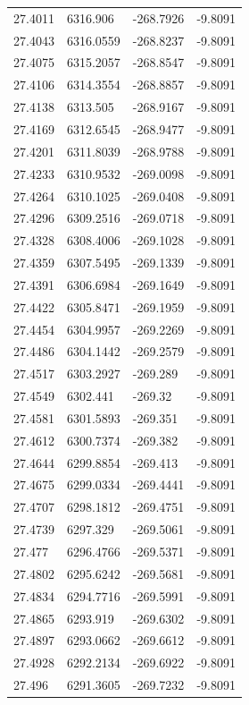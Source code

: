 \begin{table}[H]
\begin{tabular}{llll}
27.4011 & 6316.906 & -268.7926 & -9.8091 \\
27.4043 & 6316.0559 & -268.8237 & -9.8091 \\
27.4075 & 6315.2057 & -268.8547 & -9.8091 \\
27.4106 & 6314.3554 & -268.8857 & -9.8091 \\
27.4138 & 6313.505 & -268.9167 & -9.8091 \\
27.4169 & 6312.6545 & -268.9477 & -9.8091 \\
27.4201 & 6311.8039 & -268.9788 & -9.8091 \\
27.4233 & 6310.9532 & -269.0098 & -9.8091 \\
27.4264 & 6310.1025 & -269.0408 & -9.8091 \\
27.4296 & 6309.2516 & -269.0718 & -9.8091 \\
27.4328 & 6308.4006 & -269.1028 & -9.8091 \\
27.4359 & 6307.5495 & -269.1339 & -9.8091 \\
27.4391 & 6306.6984 & -269.1649 & -9.8091 \\
27.4422 & 6305.8471 & -269.1959 & -9.8091 \\
27.4454 & 6304.9957 & -269.2269 & -9.8091 \\
27.4486 & 6304.1442 & -269.2579 & -9.8091 \\
27.4517 & 6303.2927 & -269.289 & -9.8091 \\
27.4549 & 6302.441 & -269.32 & -9.8091 \\
27.4581 & 6301.5893 & -269.351 & -9.8091 \\
27.4612 & 6300.7374 & -269.382 & -9.8091 \\
27.4644 & 6299.8854 & -269.413 & -9.8091 \\
27.4675 & 6299.0334 & -269.4441 & -9.8091 \\
27.4707 & 6298.1812 & -269.4751 & -9.8091 \\
27.4739 & 6297.329 & -269.5061 & -9.8091 \\
27.477 & 6296.4766 & -269.5371 & -9.8091 \\
27.4802 & 6295.6242 & -269.5681 & -9.8091 \\
27.4834 & 6294.7716 & -269.5991 & -9.8091 \\
27.4865 & 6293.919 & -269.6302 & -9.8091 \\
27.4897 & 6293.0662 & -269.6612 & -9.8091 \\
27.4928 & 6292.2134 & -269.6922 & -9.8091 \\
27.496 & 6291.3605 & -269.7232 & -9.8091 \\

\end{tabular}
\end{table}
